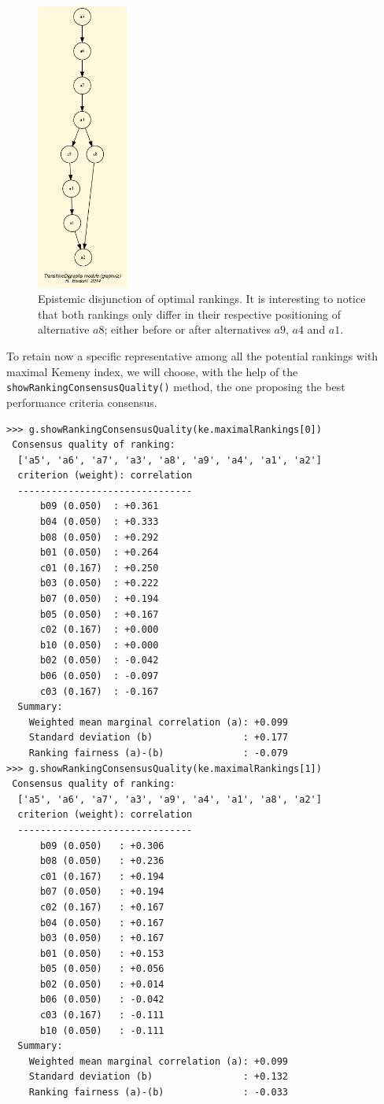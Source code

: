 \begin{figure}[h]
\sidecaption
\includegraphics[width=3cm]{Figures/tutorialKemeny.png}
\caption{Epistemic disjunction of optimal \Kemeny rankings. It is interesting to notice that both \Kemeny rankings only differ in their respective positioning of alternative $a8$; either before or after alternatives $a9$, $a4$ and $a1$. }
\label{fig:8.3}       %
\end{figure}

To retain now a specific representative among all the potential rankings with maximal Kemeny index, we will choose, with the help of the \texttt{showRankingConsensusQuality()} method, the one proposing the best performance criteria consensus.

\begin{lstlisting}[caption={Computing the consensus quality of a ranking},label=list:8.10]   
>>> g.showRankingConsensusQuality(ke.maximalRankings[0])
 Consensus quality of ranking:
  ['a5', 'a6', 'a7', 'a3', 'a8', 'a9', 'a4', 'a1', 'a2']
  criterion (weight): correlation
  -------------------------------
      b09 (0.050)  : +0.361
      b04 (0.050)  : +0.333
      b08 (0.050)  : +0.292
      b01 (0.050)  : +0.264
      c01 (0.167)  : +0.250
      b03 (0.050)  : +0.222
      b07 (0.050)  : +0.194
      b05 (0.050)  : +0.167
      c02 (0.167)  : +0.000
      b10 (0.050)  : +0.000
      b02 (0.050)  : -0.042
      b06 (0.050)  : -0.097
      c03 (0.167)  : -0.167
  Summary:
    Weighted mean marginal correlation (a): +0.099
    Standard deviation (b)                : +0.177
    Ranking fairness (a)-(b)              : -0.079
>>> g.showRankingConsensusQuality(ke.maximalRankings[1])
 Consensus quality of ranking:
  ['a5', 'a6', 'a7', 'a3', 'a9', 'a4', 'a1', 'a8', 'a2']
  criterion (weight): correlation
  -------------------------------
      b09 (0.050)   : +0.306
      b08 (0.050)   : +0.236
      c01 (0.167)   : +0.194
      b07 (0.050)   : +0.194
      c02 (0.167)   : +0.167
      b04 (0.050)   : +0.167
      b03 (0.050)   : +0.167
      b01 (0.050)   : +0.153
      b05 (0.050)   : +0.056
      b02 (0.050)   : +0.014
      b06 (0.050)   : -0.042
      c03 (0.167)   : -0.111
      b10 (0.050)   : -0.111
  Summary:
    Weighted mean marginal correlation (a): +0.099
    Standard deviation (b)                : +0.132
    Ranking fairness (a)-(b)              : -0.033
\end{lstlisting}

